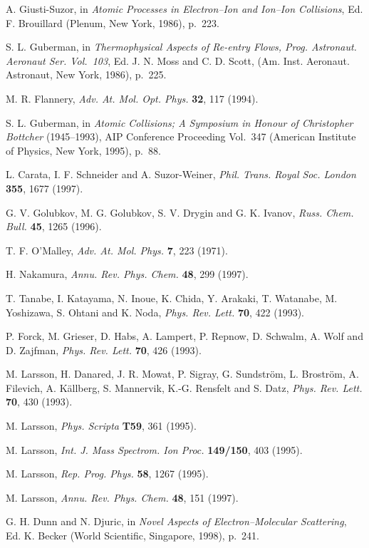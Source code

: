 \documentclass{ws-rv9x6}
\begin{document}
\begin{thebibliography}{000}
A. Giusti-Suzor, in {\it Atomic Processes in Electron--Ion and
Ion--Ion Collisions}, Ed. F. Brouillard (Plenum, New York, 1986),
p.~223.

S. L. Guberman, in {\it Thermophysical Aspects of Re-entry Flows,
Prog. Astronaut. Aeronaut Ser. Vol.~103}, Ed. J. N. Moss and C. D. Scott,
(Am. Inst. Aeronaut. Astronaut, New York, 1986), p.~225.

M. R. Flannery, {\it Adv. At. Mol. Opt. Phys.} {\bf 32}, 117 (1994).

S. L. Guberman, in {\it Atomic Collisions; A Symposium in Honour of
Christopher Bottcher} (1945--1993), AIP Conference Proceeding Vol.~347
(American Institute of Physics, New York, 1995), p.~88.

L. Carata, I. F. Schneider and A. Suzor-Weiner, {\it
Phil. Trans. Royal Soc. London} {\bf 355}, 1677 (1997).

G. V. Golubkov, M. G. Golubkov, S. V. Drygin and G. K. Ivanov, {\it
Russ. Chem. Bull.} {\bf 45}, 1265 (1996).

T. F. O'Malley, {\it Adv. At. Mol. Phys.} {\bf 7}, 223 (1971).

H. Nakamura, {\it Annu. Rev. Phys. Chem.} {\bf 48}, 299 (1997).

T. Tanabe, I. Katayama, N. Inoue, K. Chida, Y. Arakaki,
T. Watanabe, M. Yoshizawa, S. Ohtani and K. Noda, {\it Phys. Rev. Lett.} {\bf 70},
422 (1993).

P. Forck, M. Grieser, D. Habs, A. Lampert, P. Repnow,
D. Schwalm, A. Wolf and D. Zajfman, {\it Phys. Rev. Lett.} {\bf 70}, 426 (1993).

M. Larsson, H. Danared, J. R. Mowat, P. Sigray, G. Sundstr\"om,
L. Brostr\"om, A. Filevich, A. K\"allberg, S. Mannervik,
K.-G. Rensfelt and S. Datz, {\it Phys. Rev. Lett.} {\bf 70}, 430
(1993).

M. Larsson, {\it Phys. Scripta} {\bf T59}, 361 (1995).

M. Larsson, {\it Int. J. Mass Spectrom. Ion Proc.} {\bf 149/150}, 403
(1995).

M. Larsson, {\it Rep. Prog. Phys.} {\bf 58}, 1267 (1995).

M. Larsson, {\it Annu. Rev. Phys. Chem.} {\bf 48}, 151 (1997).

G. H. Dunn and N. Djuric, in {\it Novel Aspects of Electron--Molecular
Scattering}, Ed. K. Becker (World Scientific, Singapore, 1998),
p.~241.


\end{thebibliography}
\end{document}
